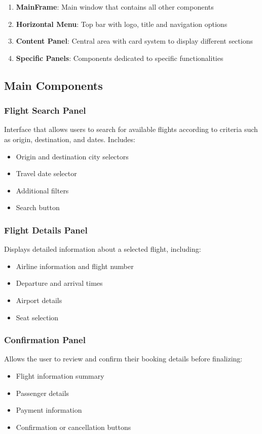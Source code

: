 \documentclass[conference]{IEEEtran}
\begin{document}
    \begin{enumerate}
        \item \textbf{MainFrame}: Main window that contains all other components
        \item \textbf{Horizontal Menu}: Top bar with logo, title and navigation options
        \item \textbf{Content Panel}: Central area with card system to display different sections
        \item \textbf{Specific Panels}: Components dedicated to specific functionalities
    \end{enumerate}

    \subsection{Main Components}

    \subsubsection{Flight Search Panel}
    Interface that allows users to search for available flights according to criteria such as origin, destination, and dates. Includes:
    \begin{itemize}
        \item Origin and destination city selectors
        \item Travel date selector
        \item Additional filters
        \item Search button
    \end{itemize}

    \subsubsection{Flight Details Panel}
    Displays detailed information about a selected flight, including:
    \begin{itemize}
        \item Airline information and flight number
        \item Departure and arrival times
        \item Airport details
        \item Seat selection
    \end{itemize}

    \subsubsection{Confirmation Panel}
    Allows the user to review and confirm their booking details before finalizing:
    \begin{itemize}
        \item Flight information summary
        \item Passenger details
        \item Payment information
        \item Confirmation or cancellation buttons
    \end{itemize}
\end{document}
